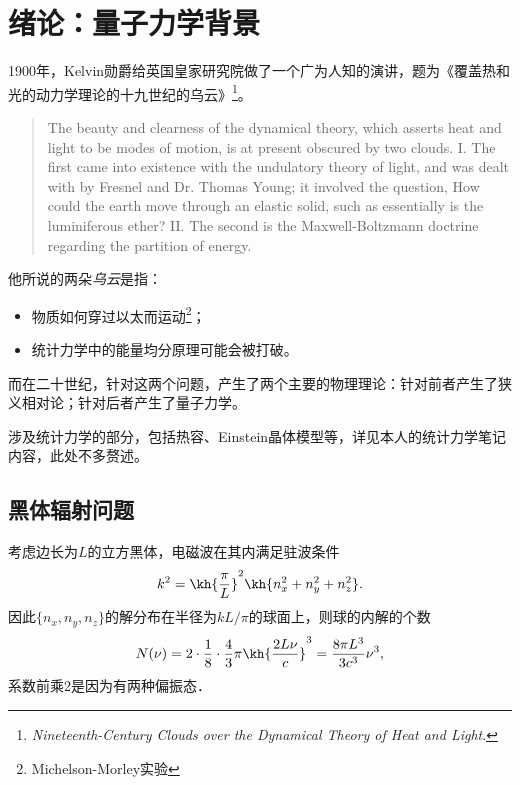 \setcounter{chapter}{-1}
\chapter{绪论：量子力学背景}

1900年，Kelvin勋爵给英国皇家研究院做了一个广为人知的演讲，题为《覆盖热和光的动力学理论的十九世纪的乌云》\footnote{\textit{Nineteenth-Century Clouds over the Dynamical Theory of Heat and Light}. }。
\begin{quote}
	The beauty and clearness of the dynamical theory, which asserts heat and light to be modes of motion, is at present obscured by two clouds.
	I. The first came into existence with the undulatory theory of light, and was dealt with by Fresnel and Dr. Thomas Young; it involved the question, How could the earth move through an elastic solid, such as essentially is the luminiferous ether?
	II. The second is the Maxwell-Boltzmann doctrine regarding the partition of energy.
\end{quote}
他所说的两朵\textit{乌云}是指：
\begin{itemize}
    \item 物质如何穿过以太而运动\footnote{Michelson-Morley实验}；
    \item 统计力学中的能量均分原理可能会被打破。
\end{itemize}
而在二十世纪，针对这两个问题，产生了两个主要的物理理论：针对前者产生了狭义相对论；针对后者产生了量子力学。%

涉及统计力学的部分，包括热容、Einstein晶体模型等，详见本人的统计力学笔记内容，此处不多赘述。
\section{黑体辐射问题}
考虑边长为$L$的立方黑体，电磁波在其内满足驻波条件
\[
	k^2=\kh{\frac\pi{L}}^2\kh{n_x^2+n_y^2+n_z^2}.
\]
因此$\{n_x,n_y,n_z\}$的解分布在半径为$kL/\pi$的球面上，则球的内解的个数
\[
	N(\nu)=2\cdot\frac18\cdot\frac43\pi\kh{\frac{2L\nu}c}^3=\frac{8\pi L^3}{3c^3}\nu^3,
\]
系数前乘2是因为有两种偏振态．

